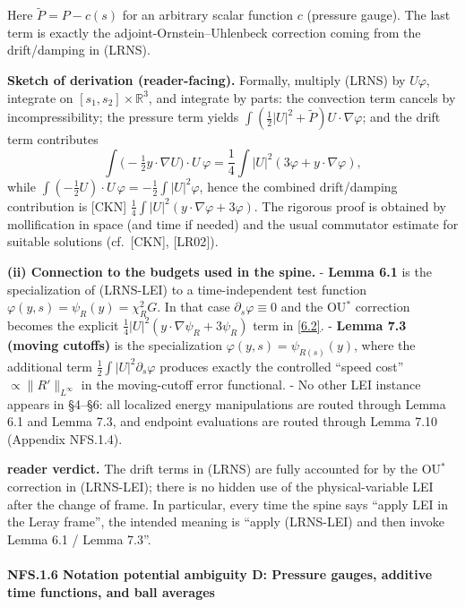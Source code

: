 \documentclass[
  11pt,
]{article}
\begin{document}
Here \(\widetilde P=P-c(s)\) for an arbitrary scalar function \(c\) (pressure gauge). The last term is exactly the adjoint-Ornstein--Uhlenbeck correction coming from the drift/damping in (LRNS).

\textbf{Sketch of derivation (reader-facing).} Formally, multiply (LRNS) by \(U\varphi\), integrate on \([s_1,s_2]\times\mathbb R^3\), and integrate by parts: the convection term cancels by incompressibility; the pressure term yields \(\int (\tfrac12|U|^2+\widetilde P)U\cdot\nabla\varphi\); and the drift term contributes \[
\int\!\Big(-\tfrac12 y\cdot\nabla U\Big)\cdot U\,\varphi
=\frac14\int |U|^2(3\varphi+y\cdot\nabla\varphi),
\] while \(\int(-\tfrac12U)\cdot U\,\varphi=-\tfrac12\int |U|^2\varphi\), hence the combined drift/damping contribution is {[}CKN{]} \(\frac14\int |U|^2(y\cdot\nabla\varphi+3\varphi)\). The rigorous proof is obtained by mollification in space (and time if needed) and the usual commutator estimate for suitable solutions (cf.~{[}CKN{]}, {[}LR02{]}).

\textbf{(ii) Connection to the budgets used in the spine.} - \textbf{Lemma 6.1} is the specialization of (LRNS-LEI) to a time-independent test function \(\varphi(y,s)=\psi_R(y)=\chi_R^2G\). In that case \(\partial_s\varphi\equiv 0\) and the OU\(^\ast\) correction becomes the explicit \(\tfrac14|U|^2(y\cdot\nabla\psi_R+3\psi_R)\) term in \eqref{6.2}. - \textbf{Lemma 7.3 (moving cutoffs)} is the specialization \(\varphi(y,s)=\psi_{R(s)}(y)\), where the additional term \(\tfrac12\int |U|^2\partial_s\varphi\) produces exactly the controlled ``speed cost'' \(\propto \|R'\|_{L^\infty}\) in the moving-cutoff error functional. - No other LEI instance appears in §4--§6: all localized energy manipulations are routed through Lemma 6.1 and Lemma 7.3, and endpoint evaluations are routed through Lemma 7.10 (Appendix NFS.1.4).

\textbf{reader verdict.} The drift terms in (LRNS) are fully accounted for by the OU\(^\ast\) correction in (LRNS-LEI); there is no hidden use of the physical-variable LEI after the change of frame. In particular, every time the spine says ``apply LEI in the Leray frame'', the intended meaning is ``apply (LRNS-LEI) and then invoke Lemma 6.1 / Lemma 7.3''.

\hypertarget{nfs.1.6-notation-potential-ambiguity-d-pressure-gauges-additive-time-functions-and-ball-averages}{%
\paragraph{NFS.1.6 Notation potential ambiguity D: Pressure gauges, additive time functions, and ball averages}\label{nfs.1.6-notation-potential-ambiguity-d-pressure-gauges-additive-time-functions-and-ball-averages}}
\end{document}
